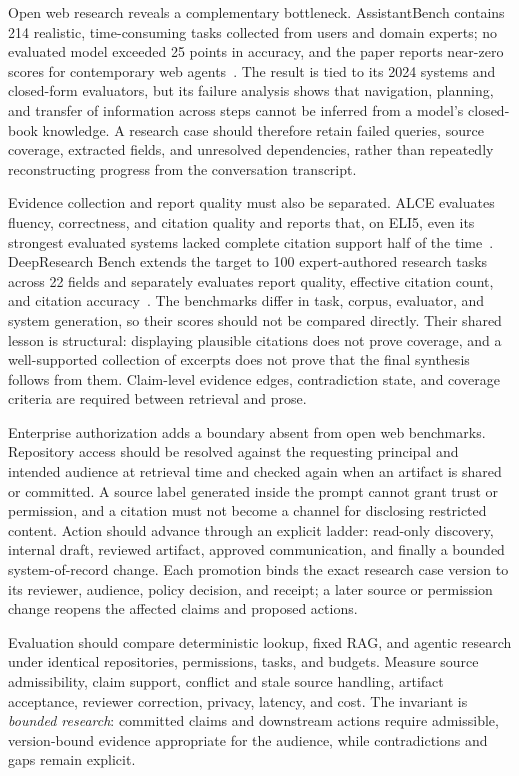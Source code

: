 Open web research reveals a complementary bottleneck. AssistantBench contains 214 realistic, time-consuming tasks collected from users and domain experts; no evaluated model exceeded 25 points in accuracy, and the paper reports near-zero scores for contemporary web agents~\cite{yoran2024assistantbench}. The result is tied to its 2024 systems and closed-form evaluators, but its failure analysis shows that navigation, planning, and transfer of information across steps cannot be inferred from a model's closed-book knowledge. A research case should therefore retain failed queries, source coverage, extracted fields, and unresolved dependencies, rather than repeatedly reconstructing progress from the conversation transcript.

Evidence collection and report quality must also be separated. ALCE evaluates fluency, correctness, and citation quality and reports that, on ELI5, even its strongest evaluated systems lacked complete citation support half of the time~\cite{gao2023alce}. DeepResearch Bench extends the target to 100 expert-authored research tasks across 22 fields and separately evaluates report quality, effective citation count, and citation accuracy~\cite{du2026deepresearchbench}. The benchmarks differ in task, corpus, evaluator, and system generation, so their scores should not be compared directly. Their shared lesson is structural: displaying plausible citations does not prove coverage, and a well-supported collection of excerpts does not prove that the final synthesis follows from them. Claim-level evidence edges, contradiction state, and coverage criteria are required between retrieval and prose.

Enterprise authorization adds a boundary absent from open web benchmarks. Repository access should be resolved against the requesting principal and intended audience at retrieval time and checked again when an artifact is shared or committed. A source label generated inside the prompt cannot grant trust or permission, and a citation must not become a channel for disclosing restricted content. Action should advance through an explicit ladder: read-only discovery, internal draft, reviewed artifact, approved communication, and finally a bounded system-of-record change. Each promotion binds the exact research case version to its reviewer, audience, policy decision, and receipt; a later source or permission change reopens the affected claims and proposed actions.

Evaluation should compare deterministic lookup, fixed RAG, and agentic research under identical repositories, permissions, tasks, and budgets. Measure source admissibility, claim support, conflict and stale source handling, artifact acceptance, reviewer correction, privacy, latency, and cost. The invariant is \emph{bounded research}: committed claims and downstream actions require admissible, version-bound evidence appropriate for the audience, while contradictions and gaps remain explicit.

